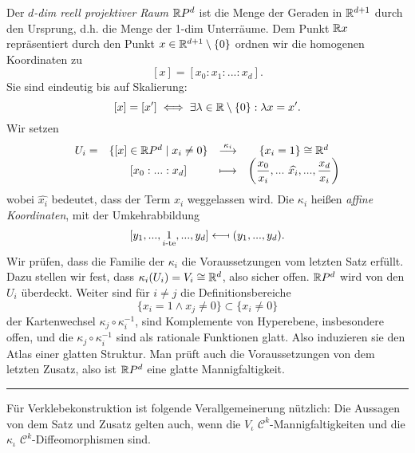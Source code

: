 \begin{example}
Der \emph{$d$-dim reell projektiver Raum $\mathbb{R} P^d$} ist die Menge der Geraden in $\mathbb{R}^{d+1}$ durch den Ursprung, d.h. die Menge der 1-dim Unterräume. Dem Punkt $\mathbb{R} x$ repräsentiert durch den Punkt $x\in \mathbb{R}^{d+1}\setminus \{0\}$ ordnen wir die homogenen Koordinaten zu
$$[x]= [x_0:x_1:...:x_d].$$
Sie sind eindeutig bis auf Skalierung:
$$[x]=[x'] \iff \exists \lambda \in \mathbb{R}\setminus \{0\}:\lambda x = x'.$$
Wir setzen
\begin{equation*}
\begin{array}{cccc}
U_i =  & \{ [x] \in \mathbb{R} P^d \mid x_i \neq 0\} & \overset{\kappa_i}\longrightarrow & \{x_i = 1\} \cong \mathbb{R}^d\\
& [x_0:...:x_d] & \longmapsto & \left( \dfrac{x_0}{x_i}, ...\  \widehat{x_i},...,\dfrac{x_d}{x_i} \right)
\end{array}
\end{equation*}
wobei $\widehat{x_i}$ bedeutet, dass der Term $x_i$ weggelassen wird. Die $\kappa_i$ heißen \emph{affine Koordinaten}, mit der Umkehrabbildung
$$[y_1,...,\underset{i\text{-te}}{1},...,y_d] \longmapsfrom (y_1,...,y_d). $$
Wir prüfen, dass die Familie der $\kappa_i$ die Voraussetzungen vom letzten Satz erfüllt. Dazu stellen wir fest, dass $\kappa_i(U_i)=V_i\cong \mathbb{R}^d$, also sicher offen. $\mathbb{R} P^d$ wird von den $U_i$ überdeckt. Weiter sind für $i \neq j$ die Definitionsbereiche
$$\{x_i=1 \wedge x_j \neq 0 \}\subset \{x_i \neq 0\}$$
der Kartenwechsel $\kappa_j\circ \kappa_i^{-1}$, sind Komplemente von Hyperebene, insbesondere offen, und die $\kappa_j \circ \kappa_i^{-1}$ sind als rationale Funktionen glatt. Also induzieren sie den Atlas einer glatten Struktur. Man prüft auch die Voraussetzungen von dem letzten Zusatz, also ist $\mathbb{R} P^d$ eine glatte Mannigfaltigkeit.
\end{example}
\rule{\textwidth}{0.4pt}\vspace{0.2pc}
Für Verklebekonstruktion ist folgende Verallgemeinerung nützlich: Die Aussagen von dem Satz und Zusatz gelten auch, wenn die $V_\iota$ $\mathcal{C}^k$-Mannigfaltigkeiten und die $\kappa_\iota$ $\mathcal{C}^k$-Diffeomorphismen sind.

